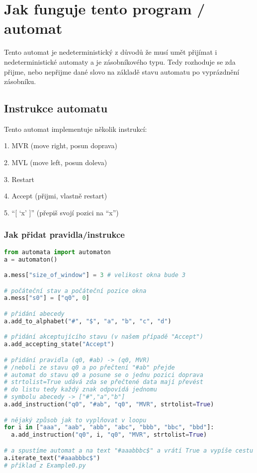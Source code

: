 \documentclass{article}
\begin{document}
\section{Jak funguje tento program / automat}

Tento automat je nedeterministický z důvodů že musí umět přijímat i nedeterministické automaty a je zásobníkového typu. Tedy rozhoduje se zda přijme, nebo nepřijme dané slovo na základě stavu automatu po vyprázdnění zásobníku.

\subsection{Instrukce automatu}

Tento automat implementuje několik instrukcí:

1.  MVR (move right, posun doprava)

2.  MVL (move left, posun doleva)

3.  Restart

4.  Accept (přijmi, vlastně restart)

5.  “[ ‘x’ ]” (přepiš svojí pozici na “x”)


\subsubsection{Jak přidat pravidla/instrukce}

\begin{lstlisting}[language=Python, caption=Příklad použití]
from automata import automaton
a = automaton()

a.mess["size_of_window"] = 3 # velikost okna bude 3

# počáteční stav a počáteční pozice okna
a.mess["s0"] = ["q0", 0]

# přidání abecedy
a.add_to_alphabet("#", "$", "a", "b", "c", "d")

# přidání akceptujícího stavu (v našem případě "Accept")
a.add_accepting_state("Accept")

# přidání pravidla (q0, #ab) -> (q0, MVR)
# /neboli ze stavu q0 a po přečtení "#ab" přejde
# automat do stavu q0 a posune se o jednu pozici doprava
# strtolist=True udává zda se přečtené data mají převést
# do listu tedy každý znak odpovídá jednomu
# symbolu abecedy -> ["#","a","b"]
a.add_instruction("q0", "#ab", "q0", "MVR", strtolist=True)

# nějaký způsob jak to vyplňovat v loopu
for i in ["aaa", "aab", "abb", "abc", "bbb", "bbc", "bbd"]:
  a.add_instruction("q0", i, "q0", "MVR", strtolist=True)

# a spustíme automat a na text "#aaabbbc$" a vrátí True a vypíše cestu s barevně označeým oknem
a.iterate_text("#aaabbbc$")
# příklad z Example0.py
\end{lstlisting}
\end{document}
